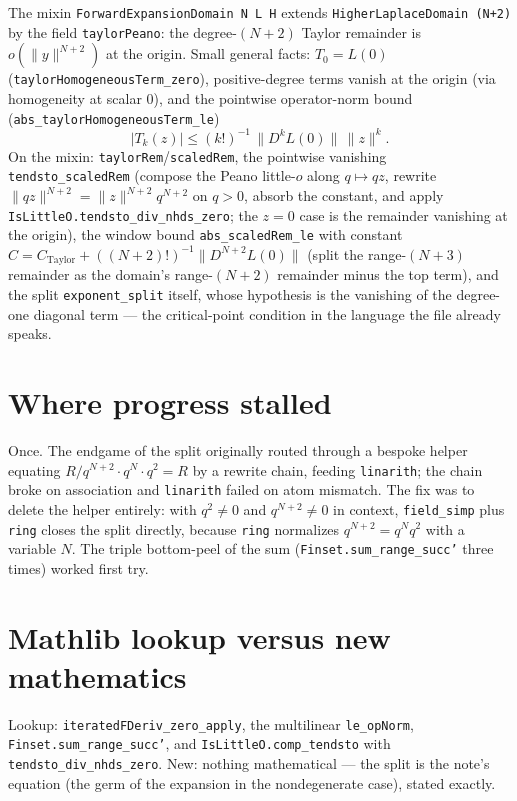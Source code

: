 \documentclass[11pt]{article}
\newcommand{\code}[1]{\texttt{#1}}
\begin{document}
The mixin \code{ForwardExpansionDomain N L H} extends
\code{HigherLaplaceDomain (N+2)} by the field \code{taylorPeano}:
the degree-$(N{+}2)$ Taylor remainder is $o(\|y\|^{N+2})$ at the
origin. Small general facts: $T_0 = L(0)$
(\code{taylorHomogeneousTerm\_zero}), positive-degree terms vanish
at the origin (via homogeneity at scalar $0$), and the pointwise
operator-norm bound (\code{abs\_taylorHomogeneousTerm\_le})
\[
  |T_k(z)| \le (k!)^{-1}\,\|D^k L(0)\|\,\|z\|^k.
\]
On the mixin:
\code{taylorRem}/\code{scaledRem}, the pointwise vanishing
\code{tendsto\_scaledRem} (compose the Peano little-$o$ along
$q \mapsto qz$, rewrite $\|qz\|^{N+2} = \|z\|^{N+2} q^{N+2}$ on
$q > 0$, absorb the constant, and apply
\code{IsLittleO.tendsto\_div\_nhds\_zero}; the $z = 0$ case is the
remainder vanishing at the origin), the window bound
\code{abs\_scaledRem\_le} with constant
$C = C_{\mathrm{Taylor}} + ((N{+}2)!)^{-1}\|D^{N+2}L(0)\|$
(split the range-$(N{+}3)$ remainder as the domain's range-$(N{+}2)$
remainder minus the top term), and the split
\code{exponent\_split} itself, whose hypothesis is the vanishing of
the degree-one diagonal term --- the critical-point condition in the
language the file already speaks.

\section{Where progress stalled}

Once. The endgame of the split originally routed through a bespoke
helper equating $R/q^{N+2} \cdot q^N \cdot q^2 = R$ by a rewrite
chain, feeding \code{linarith}; the chain broke on association and
\code{linarith} failed on atom mismatch. The fix was to delete the
helper entirely: with $q^2 \ne 0$ and $q^{N+2} \ne 0$ in context,
\code{field\_simp} plus \code{ring} closes the split directly,
because \code{ring} normalizes $q^{N+2} = q^N q^2$ with a variable
$N$. The triple bottom-peel of the sum
(\code{Finset.sum\_range\_succ'} three times) worked first try.

\section{Mathlib lookup versus new mathematics}

\begin{sloppypar}
Lookup: \code{iteratedFDeriv\_zero\_apply}, the multilinear
\code{le\_opNorm}, \code{Finset.sum\_range\_succ'}, and
\code{IsLittleO.comp\_tendsto} with
\code{tendsto\_div\_nhds\_zero}.
New: nothing mathematical --- the split is the note's equation (the
germ of the expansion in the nondegenerate case), stated exactly.
\end{sloppypar}
\end{document}
